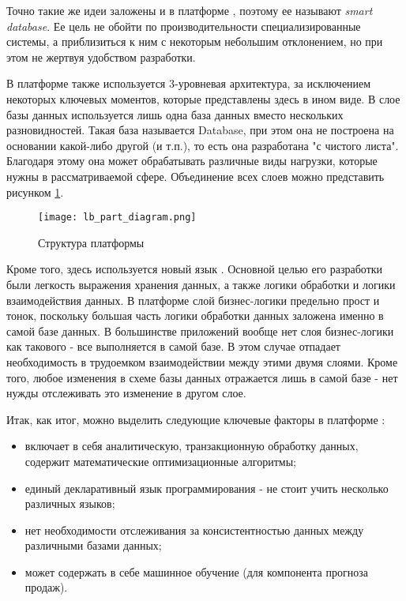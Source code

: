 Точно такие же идеи заложены и в платформе \LB, поэтому ее называют \emph{smart database}. Ее цель не обойти по производительности специализированные системы, а приблизиться к ним с некоторым небольшим отклонением, но при этом не жертвуя удобством разработки.

В платформе \LB также используется 3-уровневая архитектура, за исключением некоторых ключевых моментов, которые представлены здесь в ином виде. В слое базы данных используется лишь одна база данных вместо нескольких разновидностей. Такая база называется \LB Database, при этом она не построена на основании какой-либо другой (\postgres и т.п.), то есть она разработана "с чистого листа". Благодаря этому она может обрабатывать различные виды нагрузки, которые нужны в рассматриваемой сфере. Объединение всех слоев можно представить рисунком \ref{fig:technology:logicblox:lb_parts_diagram}.

\begin{figure}
	\centering
	\texttt{[image: lb\_part\_diagram.png]}
	\caption{Структура платформы \cite{query_parallel_execution}}
	\label{fig:technology:logicblox:lb_parts_diagram}
\end{figure}

Кроме того, здесь используется новый язык \logiql. Основной целью его разработки были легкость выражения хранения данных, а также логики обработки и логики взаимодействия данных. В платформе \LB слой бизнес-логики предельно прост и тонок, поскольку большая часть логики обработки данных заложена именно в самой базе данных. В большинстве приложений вообще нет слоя бизнес-логики как такового - все выполняется в самой базе. В этом случае отпадает необходимость в трудоемком взаимодействии между этими двумя слоями. Кроме того, любое изменения в схеме базы данных отражается лишь в самой базе - нет нужды отслеживать это изменение в другом слое.

Итак, как итог, можно выделить следующие ключевые факторы в платформе \LB:

\begin{itemize}
	\item включает в себя аналитическую, транзакционную обработку данных, содержит математические оптимизационные алгоритмы;
	\item единый декларативный язык программирования \logiql - не стоит учить несколько различных языков;
	\item нет необходимости отслеживания за консистентностью данных между различными базами данных;
	\item может содержать в себе машинное обучение (для компонента прогноза продаж).
\end{itemize}

